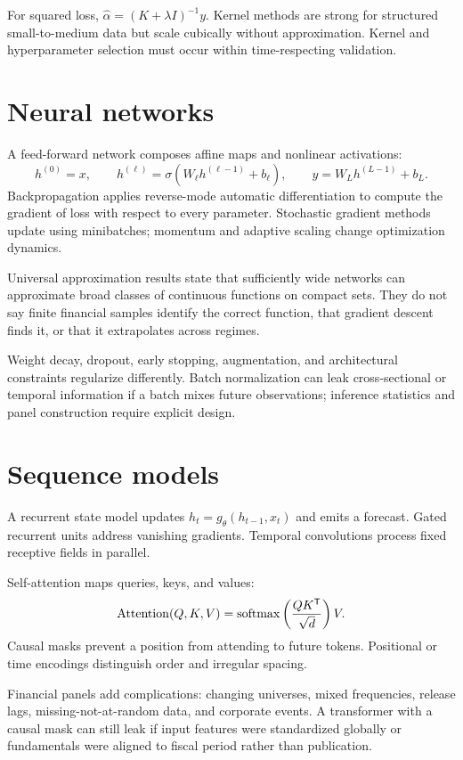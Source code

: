 For squared loss,
$\widehat\alpha=(K+\lambda I)^{-1}y$. Kernel methods are strong for structured
small-to-medium data but scale cubically without approximation. Kernel and
hyperparameter selection must occur within time-respecting validation.

\section{Neural networks}

A feed-forward network composes affine maps and nonlinear activations:
\[
h^{(0)}=x,\qquad
h^{(\ell)}=\sigma(W_\ell h^{(\ell-1)}+b_\ell),\qquad
\widehat y=W_Lh^{(L-1)}+b_L.
\]
Backpropagation applies reverse-mode automatic differentiation to compute the
gradient of loss with respect to every parameter. Stochastic gradient methods update
using minibatches; momentum and adaptive scaling change optimization dynamics.

Universal approximation results state that sufficiently wide networks can
approximate broad classes of continuous functions on compact sets. They do not say
finite financial samples identify the correct function, that gradient descent finds
it, or that it extrapolates across regimes.

Weight decay, dropout, early stopping, augmentation, and architectural constraints
regularize differently. Batch normalization can leak cross-sectional or temporal
information if a batch mixes future observations; inference statistics and panel
construction require explicit design.

\section{Sequence models}

A recurrent state model updates
$h_t=g_\theta(h_{t-1},x_t)$ and emits a forecast. Gated recurrent units address
vanishing gradients. Temporal convolutions process fixed receptive fields in
parallel.

Self-attention maps queries, keys, and values:
\[
\operatorname{Attention}(Q,K,V)=
\operatorname{softmax}\left(\frac{QK^\mathsf T}{\sqrt d}\right)V.
\]
Causal masks prevent a position from attending to future tokens. Positional or time
encodings distinguish order and irregular spacing.

Financial panels add complications: changing universes, mixed frequencies, release
lags, missing-not-at-random data, and corporate events. A transformer with a causal
mask can still leak if input features were standardized globally or fundamentals
were aligned to fiscal period rather than publication.

